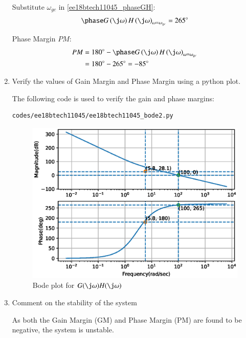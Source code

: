 \begin{enumerate}[label=\thesubsection.\arabic*.,ref=\thesubsection.\theenumi]
Substitute $\omega_{gc}$ in \eqref{ee18btech11045_phaseGH}:
\begin{align}
    \phase G\brak{\j\omega}H\brak{\j\omega}_{\omega = \omega_{gc}} = 265\degree
\end{align}

Phase Margin {$PM$}:
\begin{align}
    PM &= 180\degree - \phase G\brak{\j\omega}H\brak{\j\omega}_{\omega = \omega_{gc}}
    \\
    &= 180\degree - 265\degree = - 85\degree
\end{align}


\item Verify the values of Gain Margin and Phase Margin using a python plot.

\solution

The following code is used to verify the gain and phase margins:
\begin{lstlisting}
codes/ee18btech11045/ee18btech11045_bode2.py
\end{lstlisting}

\begin{figure}[!ht]
\centering
\includegraphics[width=\columnwidth]{./figs/ee18btech11045/ee18btech11045_bode2.eps}
\caption{Bode plot for $G(\j\omega)H(\j\omega)$}
\label{fig:ee18btech11045_bode2}
\end{figure}


\item Comment on the stability of the system

\solution

As both the Gain Margin (GM) and Phase Margin (PM) are found to be negative, the system is unstable.
\end{enumerate}